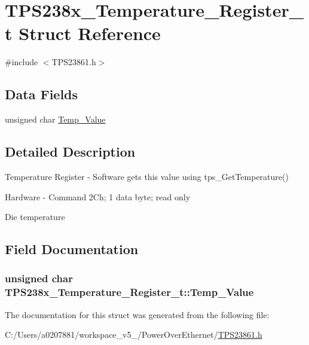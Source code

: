 \hypertarget{struct_t_p_s238x___temperature___register__t}{\section{T\-P\-S238x\-\_\-\-Temperature\-\_\-\-Register\-\_\-t Struct Reference}
\label{struct_t_p_s238x___temperature___register__t}
}


{\ttfamily \#include $<$T\-P\-S23861.\-h$>$}

\subsection*{Data Fields}
\begin{DoxyCompactItemize}
\item 
unsigned char \hyperlink{struct_t_p_s238x___temperature___register__t_ab37e5f466c6eebf49b9f7f681cf641b9}{Temp\-\_\-\-Value}
\end{DoxyCompactItemize}


\subsection{Detailed Description}
Temperature Register -\/ Software gets this value using tps\-\_\-\-Get\-Temperature() \par
 Hardware -\/ Command 2\-Ch; 1 data byte; read only \par
\par
 Die temperature 

\subsection{Field Documentation}
\hypertarget{struct_t_p_s238x___temperature___register__t_ab37e5f466c6eebf49b9f7f681cf641b9}{
\subsubsection[{Temp\-\_\-\-Value}]{\setlength{\rightskip}{0pt plus 5cm}unsigned char T\-P\-S238x\-\_\-\-Temperature\-\_\-\-Register\-\_\-t\-::\-Temp\-\_\-\-Value}}\label{struct_t_p_s238x___temperature___register__t_ab37e5f466c6eebf49b9f7f681cf641b9}


The documentation for this struct was generated from the following file\-:\begin{DoxyCompactItemize}
\item 
C\-:/\-Users/a0207881/workspace\-\_\-v5\-\_/\-Power\-Over\-Ethernet/\hyperlink{_t_p_s23861_8h}{T\-P\-S23861.\-h}\end{DoxyCompactItemize}
